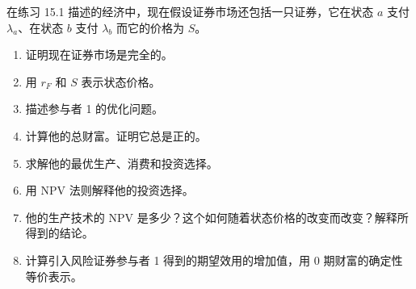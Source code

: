 \begin{problem}
 在练习 15.1 描述的经济中，现在假设证券市场还包括一只证券，它在状态 $a$ 支付 $\lambda_{a}$、在状态 $b$ 支付 $\lambda_{b}$ 而它的价格为 $S$。
\begin{enumerate}[label=(\alph*)]
    \item 证明现在证券市场是完全的。
    \item 用 $r_{F}$ 和 $S$ 表示状态价格。
    \item 描述参与者 1 的优化问题。
    \item 计算他的总财富。证明它总是正的。
    \item 求解他的最优生产、消费和投资选择。
    \item 用 NPV 法则解释他的投资选择。
    \item 他的生产技术的 NPV 是多少？这个如何随着状态价格的改变而改变？解释所得到的结论。
    \item 计算引入风险证券参与者 1 得到的期望效用的增加值，用 0 期财富的确定性等价表示。
\end{enumerate}
\end{problem}
